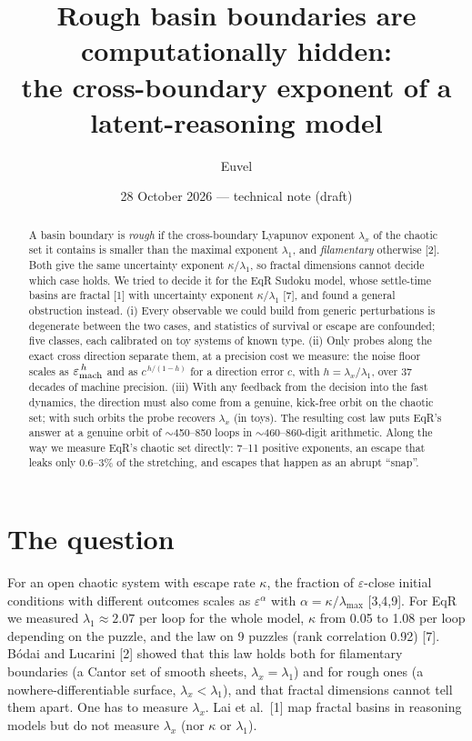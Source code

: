 \documentclass[10pt,twocolumn]{article}
\title{\vspace{-1.2cm}\Large Rough basin boundaries are computationally hidden:\\the cross-boundary exponent of a latent-reasoning model}
\author{Euvel}
\date{\small 28 October 2026 --- technical note (draft)}
\begin{document}
\maketitle

\begin{abstract}
\noindent A basin boundary is \emph{rough} if the cross-boundary Lyapunov exponent $\lambda_x$ of the chaotic set it
contains is smaller than the maximal exponent $\lambda_1$, and \emph{filamentary} otherwise [2]. Both give the same
uncertainty exponent $\kappa/\lambda_1$, so fractal dimensions cannot decide which case holds. We tried to decide it for
the EqR Sudoku model, whose settle-time basins are fractal [1] with uncertainty exponent $\kappa/\lambda_1$ [7], and
found a general obstruction instead. (i) Every observable we could build from generic perturbations is degenerate
between the two cases, and statistics of survival or escape are confounded; five classes, each calibrated on toy
systems of known type. (ii) Only probes along the exact cross direction separate them, at a precision cost we measure:
the noise floor scales as $\varepsilon_{\rm mach}^{\,h}$ and as $c^{\,h/(1-h)}$ for a direction error $c$, with
$h=\lambda_x/\lambda_1$, over 37 decades of machine precision. (iii) With any feedback from the decision into the fast
dynamics, the direction must also come from a genuine, kick-free orbit on the chaotic set; with such orbits the probe
recovers $\lambda_x$ (in toys). The resulting cost law puts EqR's answer at a genuine orbit of $\sim$450--850 loops in
$\sim$460--860-digit arithmetic. Along the way we measure EqR's chaotic set directly: 7--11 positive exponents,
an escape that leaks only 0.6--3\% of the stretching, and escapes that happen as an abrupt ``snap''.
\end{abstract}

\section{The question}
For an open chaotic system with escape rate $\kappa$, the fraction of $\varepsilon$-close initial conditions with
different outcomes scales as $\varepsilon^{\alpha}$ with $\alpha=\kappa/\lambda_{\max}$ [3,4,9]. For EqR we measured
$\lambda_1\approx2.07$ per loop for the whole model, $\kappa$ from 0.05 to 1.08 per loop depending on the puzzle, and the
law on 9 puzzles (rank correlation 0.92) [7]. B\'odai and Lucarini [2] showed that this law holds both for filamentary
boundaries (a Cantor set of smooth sheets, $\lambda_x=\lambda_1$) and for rough ones (a nowhere-differentiable
surface, $\lambda_x<\lambda_1$), and that fractal dimensions cannot tell them apart. One has to measure $\lambda_x$. Lai et al.\ [1] map fractal basins in reasoning models but do not
measure $\lambda_x$ (nor $\kappa$ or $\lambda_1$).
\end{document}

